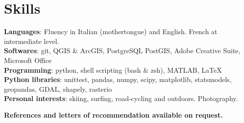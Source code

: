 \documentclass[letterpaper,11pt]{article}
\begin{document}
\section{Skills}
 \begin{itemize}[leftmargin=0.15in, label={}]
    \small{\item{
     \textbf{Languages}{: Fluency in Italian (mothertongue) and English. French at intermediate level.} \\
     \textbf{Softwares}{: git, QGIS \& ArcGIS, PostgreSQL PostGIS, Adobe Creative Suite, \indent Microsoft Office} \\
     \textbf{Programming}{: python, shell scripting (bash \& zsh), MATLAB, \LaTeX} \\
     \textbf{Python libraries}{: unittest, pandas, numpy, scipy, matplotlib, statsmodels, geopandas, GDAL, shapely, rasterio}\\
     \textbf{Personal interests}{: skiing, surfing, road-cycling and outdoors. Photography.}\\
}}
 \end{itemize}

\centering
\textbf{References and letters of recommendation available on request.}

\end{document}
